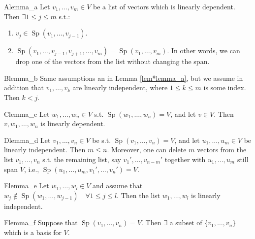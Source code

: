 \begin{lemma}{A}{lemma_a}
	Let $v_1, \hdots , v_m \in V$ be a list of vectors which is linearly dependent. Then $\exists 1 \leq j \leq m$ s.t.:
	\begin{enumerate}
		\item[(1)] $v_j \in \operatorname{Sp}(v_1, \hdots , v_{j-1})$.
		\item[(2)] $\operatorname{Sp}(v_1 ,\hdots ,v_{j-1}, v_{j+1}, \hdots , v_m ) = \operatorname{Sp}(v_1, \hdots , v_m)$. In other words, we can drop one of the vectors from the list without changing the span.
	\end{enumerate}
\end{lemma}

\begin{lemma}{B}{lemma_b}
	Same assumptions an in Lemma \ref{lem*lemma_a}, but we assume in addition that $v_1, \hdots , v_k$ are linearly independent, where $1 \leq k \leq m$ is some index. Then $k < j$.
\end{lemma}

\begin{lemma}{C}{lemma_c}
	Let $w_1, \hdots , w_n \in V$ s.t. $\operatorname{Sp}(w_1, \hdots , w_n) = V$, and let $v \in V$. Then $v, w_1, \hdots , w_n$ is linearly dependent.
\end{lemma}

\begin{lemma}{D}{lemma_d}
	Let $v_1, \hdots, v_n \in V$ be s.t. $\operatorname{Sp}(v_1, \hdots , v_n) = V$, and let $u_1, \hdots , u_m \in V$ be linearly independent. Then $m \leq n$. Moreover, one can delete $m$ vectors from the list $v_1, \hdots , v_n$ s.t. the remaining list, say $v_1', \hdots , v_{n-m}'$ together with $u_1, \hdots , u_m$ still span $V$, i.e., $\operatorname{Sp}(u_1, \hdots , u_m, v_1', \hdots , v_n') = V$.
\end{lemma}

\begin{lemma}{E}{lemma_e}
	Let $w_1, \hdots , w_l \in V$ and assume that $w_j \notin \operatorname{Sp}(w_1, \hdots , w_{j-1}) \quad \forall 1 \leq j \leq l$. Then the list $w_1, \hdots , w_l$ is linearly independent.
\end{lemma}

\begin{lemma}{F}{lemma_f}
	Suppose that $\operatorname{Sp}(v_1, \hdots , v_n) = V$. Then $\exists$ a subset of $\{v_1, \hdots , v_n\}$ which is a basis for $V$.
\end{lemma}

